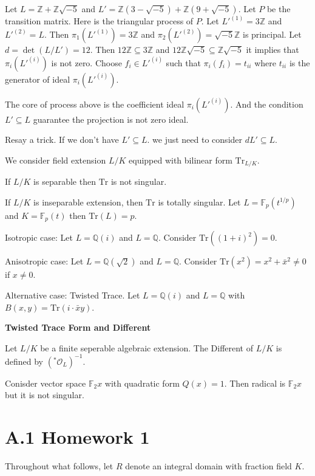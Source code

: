 \documentclass[12pt, a4paper]{article}
\newcommand{\z}{\mathbb{Z}}
\newcommand{\Q}{\mathbb{Q}}
\newcommand{\tr}{\text{Tr}}
\renewcommand{\o}{\mathcal{O}}
\begin{document}
\np Let $L= \z+\z\sqrt{-5}$ and $L' = \z(3-\sqrt{-5})+\z(9+\sqrt{-5})$. Let $P$ be the transition matrix. Here is the triangular process of $P$.
Let $L'^{(1)}= 3\mathbb{Z}$ and $L'^{(2)} = L$. Then $\pi_1(L'^{(1)}) = 3\z$ and $\pi_2(L'^{(2)}) = \sqrt{-5}\z$ is principal.
Let $d=\det(L/L') = 12$. Then $12\mathbb{Z}\subseteq 3\mathbb{Z}$ and $12 \z\sqrt{-5}\subseteq \z\sqrt{-5}$ it implies that $\pi_i(L'^{(i)})$ is not zero.
Choose $f_i\in L'^{(i)}$ such that $\pi_i(f_i)=t_{ii}$ where $t_{ii}$ is the generator of ideal $\pi_i(L'^{(i)})$.

The core of process above is the coefficient ideal $\pi_i(L'^{(i)})$. And the condition $L'\subseteq L$ guarantee the projection is not zero ideal.

\np Resay a trick. If we don't have $L'\subseteq L$. we just need to consider $dL'\subseteq L$.

We consider field extension $L/K$ equipped with bilinear form $\tr_{L/K}$.

\np If $L/K$ is separable then $\tr$ is not singular.

\np If $L/K$ is inseparable extension, then $\tr$ is totally singular.
Let $L=\mathbb{F}_p(t^{1/p})$ and $K = \mathbb{F}_p(t)$ then $\tr(L)=p$.

\np Isotropic case: Let $L=\Q(i)$ and $L=\Q$. Consider $\tr((1+i)^2)= 0$.

\np Anisotropic case: Let $L=\Q(\sqrt{2})$ and $L=\Q$. Consider $\tr(x^2)= x^2+\bar{x}^2\neq 0$ if $x\neq 0$.

\np Alternative case: Twisted Trace. Let $L=\Q(i)$ and $L=\Q$ with $B(x,y)=\tr(i\cdot \bar{x}y)$.


\textbf{Twisted Trace Form and Different}

Let $L/K$ be a finite seperable algebraic extension. The Different of $L/K$ is defined by $(^* \o_L)^{-1}$.

\np Conisder vector space $\mathbb{F}_2x$ with quadratic form $Q(x)= 1$. Then radical is $\mathbb{F}_2x$ but it is not singular.




\section*{A.1 \quad Homework 1}

Throughout what follows, let $R$ denote an integral domain with fraction field $K$.
\end{document}
